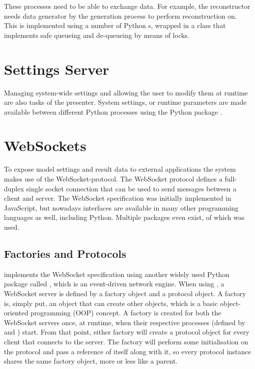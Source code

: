 \documentclass[a4paper, openany, oneside]{memoir}
\begin{document}
These processes need to be able to exchange data. For example, the reconstructor needs data generator by the generation process to perform reconstruction on. This is implemented using a number of Python s, wrapped in a class that implements safe queueing and de-queueing by means of locks.

\section{Settings Server}
\label{sec:settings_server}
Managing system-wide settings and allowing the user to modify them at runtime are also tasks of the presenter. System settings, or runtime parameters are made available between different Python processes using the Python package .


\section{WebSockets}
\label{sec:websockets}
To expose model settings and result data to external applications the system makes use of the WebSocket-protocol. The WebSocket protocol defines a full-duplex single socket connection that can be used to send messages between a client and server. The WebSocket specification was initially implemented in JavaScript, but nowadays interfaces are available in many other programming languages as well, including Python. Multiple packages even exist, of which  was used.

\subsection{Factories and Protocols}
\label{sub:autobahn}
 implements the WebSocket specification using another widely used Python package called , which is an event-driven network engine. When using , a WebSocket server is defined by a factory object and a protocol object. A factory is, simply put, an object that can create other objects, which is a basic object-oriented programming (OOP) concept. A factory is created for both the WebSocket servers once, at runtime, when their respective processes (defined by  and ) start. From that point, either factory will create a protocol object for every client that connects to the server. The factory will perform some initialisation on the protocol and pass a reference of itself along with it, so every protocol instance shares the same factory object, more or less like a parent.
\end{document}
